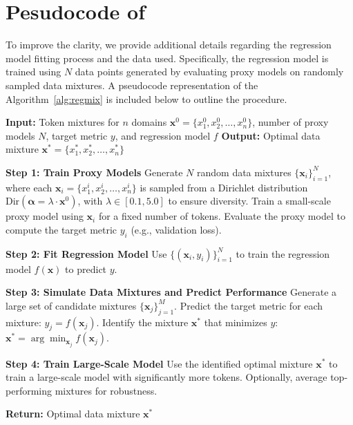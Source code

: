 \section{Pesudocode of \ourmethod}


To improve the clarity, we provide additional details regarding the regression model fitting process and the data used. Specifically, the regression model is trained using $N$ data points generated by evaluating proxy models on randomly sampled data mixtures. 
A pseudocode representation of the Algorithm~\ref{alg:regmix} is included below to outline the procedure.

\begin{algorithm}[htbp]
\caption{\ourmethod: Data Mixture as Regression}
\label{alg:regmix}
\begin{algorithmic}[1]
\STATE \textbf{Input:} Token mixtures for $n$ domains $\mathbf{x}^0 = \{x_1^0, x_2^0, \dots, x_n^0\}$, number of proxy models $N$, target metric $y$, and regression model $f$
\STATE \textbf{Output:} Optimal data mixture $\mathbf{x}^* = \{x_1^*, x_2^*, \dots, x_n^*\}$

\STATE \textbf{Step 1: Train Proxy Models}
\STATE Generate $N$ random data mixtures $\{\mathbf{x}_i\}_{i=1}^N$, where each $\mathbf{x}_i = \{x_1^i, x_2^i, \dots, x_n^i\}$ is sampled from a Dirichlet distribution $\text{Dir}(\mathbf{\alpha} = \lambda \cdot \mathbf{x}^0)$, with $\lambda \in [0.1, 5.0]$ to ensure diversity.
    \STATE Train a small-scale proxy model using $\mathbf{x}_i$ for a fixed number of tokens.
    \STATE Evaluate the proxy model to compute the target metric $y_i$ (e.g., validation loss).
\ENDFOR

\STATE \textbf{Step 2: Fit Regression Model}
\STATE Use $\{(\mathbf{x}_i, y_i)\}_{i=1}^N$ to train the regression model $f(\mathbf{x})$ to predict $y$.

\STATE \textbf{Step 3: Simulate Data Mixtures and Predict Performance}
\STATE Generate a large set of candidate mixtures $\{\mathbf{x}_j\}_{j=1}^M$.
\STATE Predict the target metric for each mixture: $y_j = f(\mathbf{x}_j)$.
\STATE Identify the mixture $\mathbf{x}^*$ that minimizes $y$: $\mathbf{x}^* = \arg\min_{\mathbf{x}_j} f(\mathbf{x}_j)$.

\STATE \textbf{Step 4: Train Large-Scale Model}
\STATE Use the identified optimal mixture $\mathbf{x}^*$ to train a large-scale model with significantly more tokens. Optionally, average top-performing mixtures for robustness.

\STATE \textbf{Return:} Optimal data mixture $\mathbf{x}^*$
\end{algorithmic}
\end{algorithm}


